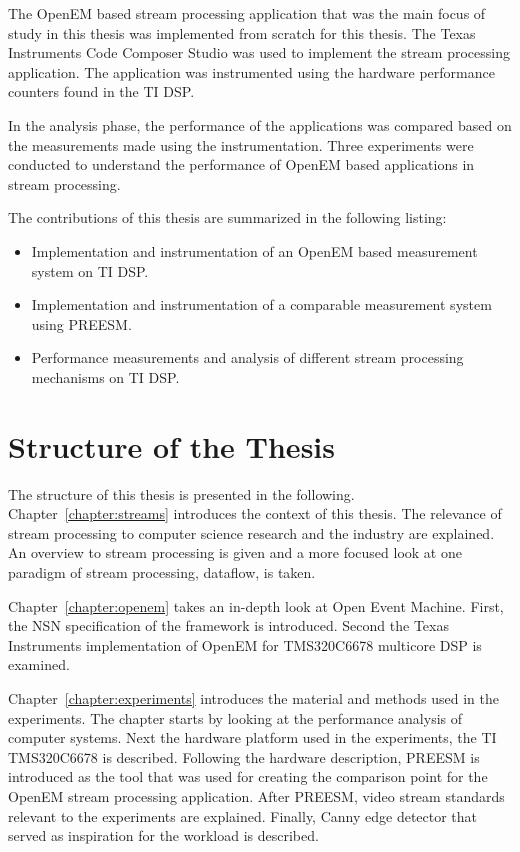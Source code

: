 The OpenEM based stream processing application that was the main focus of study in this thesis was implemented from scratch for this thesis. The Texas Instruments Code Composer Studio was used to implement the stream processing application. The application was instrumented using the hardware performance counters found in the TI DSP.

In the analysis phase, the performance of the applications was compared based on the measurements made using the instrumentation. Three experiments were conducted to understand the performance of OpenEM based applications in stream processing.

The contributions of this thesis are summarized in the following listing:
\begin{itemize}
    \item Implementation and instrumentation of an OpenEM based measurement system on TI DSP.
    \item Implementation and instrumentation of a comparable measurement system using PREESM.
    \item Performance measurements and analysis of different stream processing mechanisms on TI DSP.
\end{itemize}

\section{Structure of the Thesis}
\label{section:structure}
The structure of this thesis is presented in the following. Chapter~\ref{chapter:streams} introduces the context of this thesis. The relevance of stream processing to computer science research and the industry are explained. An overview to stream processing is given and a more focused look at one paradigm of stream processing, dataflow, is taken.

Chapter~\ref{chapter:openem} takes an in-depth look at Open Event Machine. First, the NSN specification of the framework is introduced. Second the Texas Instruments implementation of OpenEM for TMS320C6678 multicore DSP is examined.

Chapter~\ref{chapter:experiments} introduces the material and methods used in the experiments. The chapter starts by looking at the performance analysis of computer systems. Next the hardware platform used in the experiments, the TI TMS320C6678 is described. Following the hardware description, PREESM is introduced as the tool that was used for creating the comparison point for the OpenEM stream processing application. After PREESM, video stream standards relevant to the experiments are explained. Finally, Canny edge detector that served as inspiration for the workload is described.

